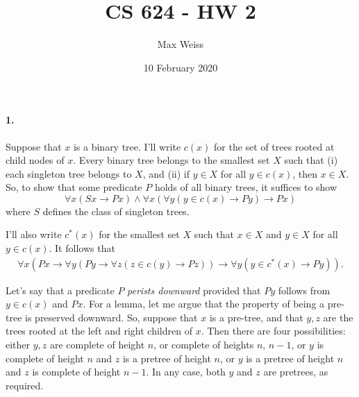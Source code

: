 \documentclass[
]{article}
\date{10 February 2020}
\title{CS 624 - HW 2}
\author{Max Weiss}
\begin{document}
\maketitle

\paragraph{1.} 


Suppose that $x$ is a binary tree.  I'll write $c(x)$ for the set of trees rooted at child nodes of $x$.  Every binary tree belongs to the smallest set $X$ such that (i) each singleton tree belongs to $X$, and (ii) if $y\in X$ for all $y\in c(x)$, then $x\in X$.  So, to show that some predicate $P$ holds of all binary trees, it suffices to show
\begin{equation}
  \label{eq:treeInduction}
  \forall x (Sx\to Px) \land \forall x(\forall y(y\in c(x)\to Py)\to Px)
\end{equation}
where $S$ defines the class of singleton trees.

I'll also write $c^*(x)$ for the smallest set $X$ such that $x\in X$ and $y\in X$ for all $y\in c(x)$.  It follows that
\begin{align}
  \label{eq:childInduction}
  \forall x
  (Px \to \forall y (Py\to \forall z(z\in c(y)\to Pz))
  \to
  \forall y(y\in c^*(x)\to Py)).
\end{align}

Let's say that a predicate $P$ \emph{perists downward} provided that $Py$ follows from $y\in c(x)$ and $Px$.  For a lemma, let me argue that the property of being a pre-tree is preserved downward.  So, suppose that $x$ is a pre-tree, and that $y,z$ are the trees rooted at the left and right children of $x$.  Then there are four possibilities: either $y,z$ are complete of height $n$, or complete of heights $n,\,n-1$, or $y$ is complete of height $n$ and $z$ is a pretree of height $n$, or $y$ is a pretree of height $n$ and $z$ is complete of height $n-1$.  In any case, both $y$ and $z$ are pretrees, as required.
\end{document}
